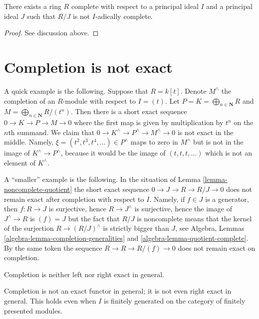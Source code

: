 \begin{lemma}
\label{lemma-noncomplete-quotient}
There exists a ring $R$ complete with respect to a principal ideal
$I$ and a principal ideal $J$ such that $R/J$ is not $I$-adically
complete.
\end{lemma}

\begin{proof}
See discussion above.
\end{proof}



\section{Completion is not exact}
\label{section-completion-not-exact}

\noindent
A quick example is the following. Suppose that $R = k[t]$. Denote $M^\wedge$
the completion of an $R$-module with respect to $I = (t)$. Let
$P = K = \bigoplus_{n \in \mathbf{N}} R$ and
$M = \bigoplus_{n \in \mathbf{N}} R/(t^n)$. Then there is a short exact
sequence $0 \to K \to P \to M \to 0$ where the first map is given by
multiplication by $t^n$ on the $n$th summand. We claim that
$0 \to K^\wedge \to P^\wedge \to M^\wedge \to 0$ is not exact in the middle.
Namely, $\xi = (t^2, t^3, t^4, \ldots) \in P^\wedge$ maps to zero in
$M^\wedge$ but is not in the image of $K^\wedge \to P^\wedge$, because
it would be the image of $(t, t, t, \ldots)$ which is not an element of
$K^\wedge$.

\medskip\noindent
A ``smaller'' example is the following. In the situation of
Lemma \ref{lemma-noncomplete-quotient}
the short exact sequence $0 \to J \to R \to R/J \to 0$ does not remain
exact after completion with respect to $I$.
Namely, if $f \in J$ is a generator, then
$f : R \to J$ is surjective, hence $R \to J^\wedge$ is surjective, hence
the image of $J^\wedge \to R$ is $(f) = J$ but the fact that
$R/J$ is noncomplete means that the kernel of the surjection
$R \to (R/J)^\wedge$ is strictly bigger than $J$, see
Algebra, Lemmas \ref{algebra-lemma-completion-generalities} and
\ref{algebra-lemma-quotient-complete}.
By the same token the sequence
$R \to R \to R/(f) \to 0$ does not remain exact on completion.

\begin{lemma}
\label{lemma-completion-not-exact}
\begin{slogan}
Completion is neither left nor right exact in general.
\end{slogan}
Completion is not an exact functor in general; it is not even
right exact in general. This holds even when $I$ is finitely
generated on the category of finitely presented modules.
\end{lemma}

